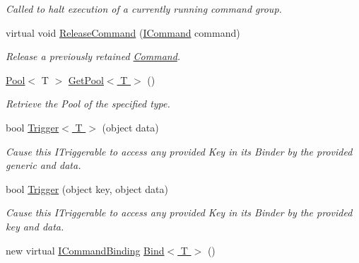 \begin{DoxyCompactItemize}
\begin{DoxyCompactList}\small\item\em Called to halt execution of a currently running command group. \end{DoxyCompactList}\item 
virtual void \hyperlink{classstrange_1_1extensions_1_1command_1_1impl_1_1_command_binder_a09d4317fb2d40a84fe7979ed7296c803}{Release\-Command} (\hyperlink{interfacestrange_1_1extensions_1_1command_1_1api_1_1_i_command}{I\-Command} command)
\begin{DoxyCompactList}\small\item\em Release a previously retained \hyperlink{classstrange_1_1extensions_1_1command_1_1impl_1_1_command}{Command}. \end{DoxyCompactList}\item 
\hypertarget{classstrange_1_1extensions_1_1command_1_1impl_1_1_command_binder_a3a548ce87ab1beb018fea94f52f065ad}{\hyperlink{classstrange_1_1extensions_1_1pool_1_1impl_1_1_pool}{Pool}$<$ T $>$ \hyperlink{classstrange_1_1extensions_1_1command_1_1impl_1_1_command_binder_a3a548ce87ab1beb018fea94f52f065ad}{Get\-Pool$<$ T $>$} ()}\label{classstrange_1_1extensions_1_1command_1_1impl_1_1_command_binder_a3a548ce87ab1beb018fea94f52f065ad}

\begin{DoxyCompactList}\small\item\em Retrieve the Pool of the specified type. \end{DoxyCompactList}\item 
bool \hyperlink{classstrange_1_1extensions_1_1command_1_1impl_1_1_command_binder_ad36f925e5e11f3407531b66c27d78d14}{Trigger$<$ T $>$} (object data)
\begin{DoxyCompactList}\small\item\em Cause this I\-Triggerable to access any provided Key in its Binder by the provided generic and data. \end{DoxyCompactList}\item 
bool \hyperlink{classstrange_1_1extensions_1_1command_1_1impl_1_1_command_binder_a89b307b59946a314b5eaf6cbe4a83dc2}{Trigger} (object key, object data)
\begin{DoxyCompactList}\small\item\em Cause this I\-Triggerable to access any provided Key in its Binder by the provided key and data. \end{DoxyCompactList}\item 
\hypertarget{classstrange_1_1extensions_1_1command_1_1impl_1_1_command_binder_a2ebf06f8c2b143f7af5475c851173808}{new virtual \hyperlink{interfacestrange_1_1extensions_1_1command_1_1api_1_1_i_command_binding}{I\-Command\-Binding} \hyperlink{classstrange_1_1extensions_1_1command_1_1impl_1_1_command_binder_a2ebf06f8c2b143f7af5475c851173808}{Bind$<$ T $>$} ()}\label{classstrange_1_1extensions_1_1command_1_1impl_1_1_command_binder_a2ebf06f8c2b143f7af5475c851173808}


\end{DoxyCompactItemize}
